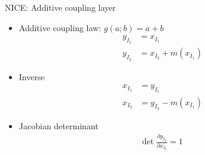 \begin{frame}{NICE: Additive coupling layer}
\begin{itemize}
    \item Additive coupling law: $g(a; b) = a + b$
    \begin{align*}
                y_{I_1} &= x_{I_1} \\
                y_{I_2} &= x_{I_2} + m(x_{I_1})
    \end{align*}
    \item Inverse
    \begin{align*}
                x_{I_1} &= y_{I_1} \\
                x_{I_2} &= y_{I_2} - m(x_{I_1})
    \end{align*}
    \item Jacobian determinant
    \begin{align*}
        \text{det} \; \frac{\partial y_{I_2}}{\partial x_{I_2}} = 1
    \end{align*}
\end{itemize}
\end{frame}

